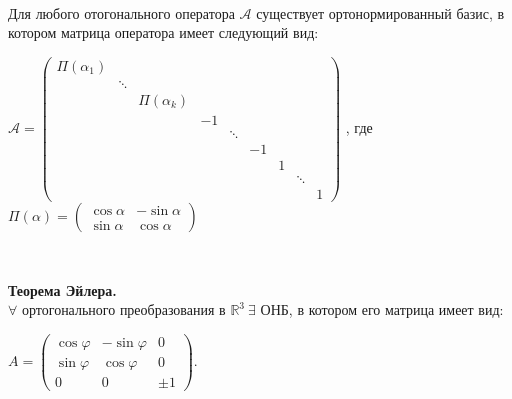 \documentclass{article}
\begin{document}
    {
        $\;$
        \setlength{\parindent}{0.4cm}
        \hangindent=0.4cm

    Для любого отогонального оператора $\mathcal{A}$ существует ортонормированный базис, в котором матрица оператора имеет следующий вид:

        \begin{center}

            $
            \mathcal{A} =
            \begin{pmatrix}
                \Pi(\alpha_1) &        &               &    &        &    &   &        &   \\
                & \ddots &               &    &        &    &   &        &   \\
                &        & \Pi(\alpha_k) &    &        &    &   &        &   \\
                &        &               & -1 &        &    &   &        &   \\
                &        &               &    & \ddots &    &   &        &   \\
                &        &               &    &        & -1 &   &        &   \\
                &        &               &    &        &    & 1 &        &   \\
                &        &               &    &        &    &   & \ddots &   \\
                &        &               &    &        &    &   &        & 1
            \end{pmatrix}
            $ , где $\Pi(\alpha) = \begin{pmatrix}
                                       \cos \alpha & -\sin \alpha \\
                                       \sin \alpha & \cos \alpha
            \end{pmatrix}$

        \end{center}

        $\;$

        \textbf{Теорема Эйлера.} \\
        $\forall$ ортогонального преобразования в $\mathbb{R}^3\ \exists$ ОНБ, в котором его матрица имеет вид$:$

        $A=\begin{pmatrix}
               \cos\varphi & -\sin\varphi & 0    \\
               \sin\varphi & \cos\varphi  & 0    \\
               0           & 0            & \pm1
        \end{pmatrix}$.\\

        $\:$

        \setlength{\parindent}{0cm}
        \hangindent=0cm
    }
\end{document}
